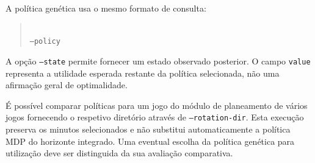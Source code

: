 A política genética usa o mesmo formato de consulta:
\begin{quote}
\small
{}\\
\texttt{--policy}\\
\end{quote}
A opção \texttt{--state} permite fornecer um estado observado posterior.
O campo \texttt{value} representa a utilidade esperada restante da política
selecionada, não uma afirmação geral de optimalidade.

É possível comparar políticas para um jogo do módulo de planeamento de vários jogos fornecendo o
respetivo diretório através de \texttt{--rotation-dir}. Esta execução
preserva os minutos selecionados e não substitui automaticamente a política
MDP do horizonte integrado. Uma eventual escolha da política genética
para utilização deve ser distinguida da sua avaliação comparativa.
